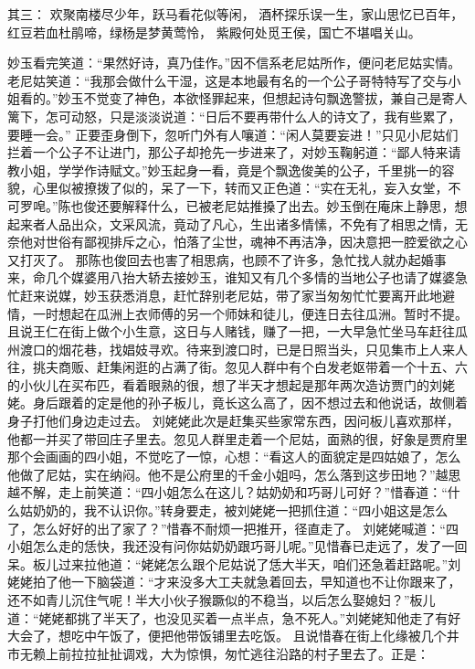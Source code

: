 \documentclass[12pt,oneside]{book}
\begin{document}
其三：
欢聚南楼尽少年，跃马看花似等闲，
酒杯探乐误一生，家山思忆已百年，
红豆若血杜鹃啼，绿杨是梦黄莺怜，
紫殿何处觅王侯，国亡不堪唱关山。

妙玉看完笑道：“果然好诗，真乃佳作。”因不信系老尼姑所作，便问老尼姑实情。老尼姑笑道：“我那会做什么干湿，这是本地最有名的一个公子哥特特写了交与小姐看的。”妙玉不觉变了神色，本欲怪罪起来，但想起诗句飘逸警拔，兼自己是寄人篱下，怎可动怒，只是淡淡说道：“日后不要再带什么人的诗文了，我有些累了，要睡一会。”
正要歪身倒下，忽听门外有人嚷道：“闲人莫要妄进！”只见小尼姑们拦着一个公子不让进门，那公子却抢先一步进来了，对妙玉鞠躬道：“鄙人特来请教小姐，学学作诗赋文。”妙玉起身一看，竟是个飘逸俊美的公子，千里挑一的容貌，心里似被撩拨了似的，呆了一下，转而又正色道：“实在无礼，妄入女堂，不可罗唣。”陈也俊还要解释什么，已被老尼姑推搡了出去。妙玉倒在庵床上静思，想起来者人品出众，文采风流，竟动了凡心，生出诸多情愫，不免有了相思之情，无奈他对世俗有鄙视排斥之心，怕落了尘世，魂神不再洁净，因决意把一腔爱欲之心又打灭了。
那陈也俊回去也害了相思病，也顾不了许多，急忙找人就办起婚事来，命几个媒婆用八抬大轿去接妙玉，谁知又有几个多情的当地公子也请了媒婆急忙赶来说媒，妙玉获悉消息，赶忙辞别老尼姑，带了家当匆匆忙忙要离开此地避情，一时想起在瓜洲上衣师傅的另一个师妹和徒儿，便连日去往瓜洲。暂时不提。
且说王仁在街上做个小生意，这日与人赌钱，赚了一把，一大早急忙坐马车赶往瓜州渡口的烟花巷，找娼妓寻欢。待来到渡口时，已是日照当头，只见集市上人来人往，挑夫商贩、赶集闲逛的占满了街。忽见人群中有个白发老妪带着一个十五、六的小伙儿在买布匹，看着眼熟的很，想了半天才想起是那年两次造访贾门的刘姥姥。身后跟着的定是他的孙子板儿，竟长这么高了，因不想过去和他说话，故侧着身子打他们身边走过去。
刘姥姥此次是赶集买些家常东西，因问板儿喜欢那样，他都一并买了带回庄子里去。忽见人群里走着一个尼姑，面熟的很，好象是贾府里那个会画画的四小姐，不觉吃了一惊，心想：“看这人的面貌定是四姑娘了，怎么他做了尼姑，实在纳闷。他不是公府里的千金小姐吗，怎么落到这步田地？”越思越不解，走上前笑道：“四小姐怎么在这儿？姑奶奶和巧哥儿可好？”惜春道：“什么姑奶奶的，我不认识你。”转身要走，被刘姥姥一把抓住道：“四小姐这是怎么了，怎么好好的出了家了？”惜春不耐烦一把推开，径直走了。
刘姥姥喊道：“四小姐怎么走的恁快，我还没有问你姑奶奶跟巧哥儿呢。”见惜春已走远了，发了一回呆。板儿过来拉他道：“姥姥怎么跟个尼姑说了恁大半天，咱们还急着赶路呢。”刘姥姥拍了他一下脑袋道：“才来没多大工夫就急着回去，早知道也不让你跟来了，还不如青儿沉住气呢！半大小伙子猴蹶似的不稳当，以后怎么娶媳妇？”板儿道：“姥姥都挑了半天了，也没见买着一点半点，急不死人。”刘姥姥知他走了有好大会了，想吃中午饭了，便把他带饭铺里去吃饭。
且说惜春在街上化缘被几个井市无赖上前拉拉扯扯调戏，大为惊惧，匆忙逃往沿路的村子里去了。正是：
\end{document}
